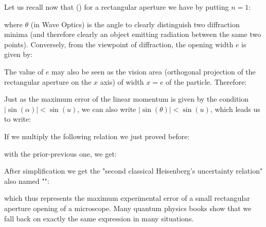 	Let us recall now that () for a rectangular aperture we have by putting $n=1$:
	
	where $\theta$ (in Wave Optics) is the angle to clearly distinguish two diffraction minima (and therefore clearly an object emitting radiation between the same two points). Conversely, from the viewpoint of diffraction, the opening width $e$ is given by:
	
	The value of $e$ may also be seen as the vision area (orthogonal projection of the rectangular aperture on the $x$ axis) of width $x=e$ of the particle. Therefore:
	
	Just as the maximum error of the linear momentum is given by the condition $|\sin(\alpha)|<\sin(u)$, we can also write  $|\sin(\theta)|<\sin(u)$, which leads us to write:
	
	If we multiply the following relation we just proved before:
	
	with the prior-previous one, we get:
	
	After simplification we get the "second classical Heisenberg's uncertainty relation" also named "":
	
	which thus represents the maximum experimental error of a small rectangular aperture opening of a microscope. Many quantum physics books show that we fall back on exactly the same expression in many situations.
	
